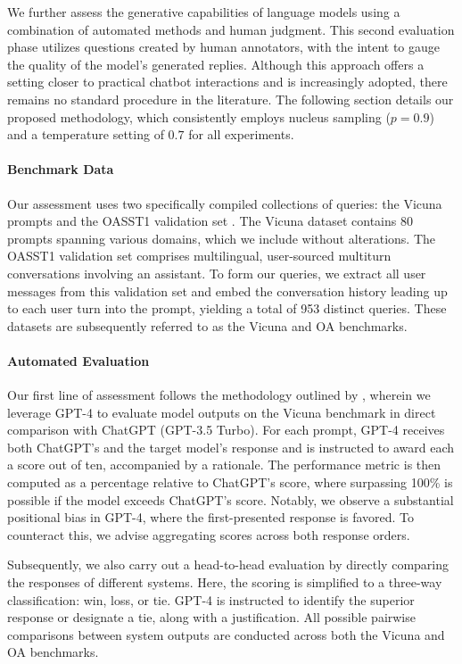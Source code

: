 We further assess the generative capabilities of language models using a combination of automated methods and human judgment. This second evaluation phase utilizes questions created by human annotators, with the intent to gauge the quality of the model's generated replies. Although this approach offers a setting closer to practical chatbot interactions and is increasingly adopted, there remains no standard procedure in the literature. The following section details our proposed methodology, which consistently employs nucleus sampling ($p=0.9$) and a temperature setting of $0.7$ for all experiments.

\paragraph{Benchmark Data} Our assessment uses two specifically compiled collections of queries: the Vicuna prompts \citep{vicuna2023} and the OASST1 validation set \citep{kopf2023openassistant}. The Vicuna dataset contains 80 prompts spanning various domains, which we include without alterations. The OASST1 validation set comprises multilingual, user-sourced multiturn conversations involving an assistant. To form our queries, we extract all user messages from this validation set and embed the conversation history leading up to each user turn into the prompt, yielding a total of 953 distinct queries. These datasets are subsequently referred to as the Vicuna and OA benchmarks.

\paragraph{Automated Evaluation} Our first line of assessment follows the methodology outlined by \citet{vicuna2023}, wherein we leverage GPT-4 to evaluate model outputs on the Vicuna benchmark in direct comparison with ChatGPT (GPT-3.5 Turbo). For each prompt, GPT-4 receives both ChatGPT’s and the target model’s response and is instructed to award each a score out of ten, accompanied by a rationale. The performance metric is then computed as a percentage relative to ChatGPT’s score, where surpassing 100\% is possible if the model exceeds ChatGPT’s score. Notably, we observe a substantial positional bias in GPT-4, where the first-presented response is favored. To counteract this, we advise aggregating scores across both response orders.

Subsequently, we also carry out a head-to-head evaluation by directly comparing the responses of different systems. Here, the scoring is simplified to a three-way classification: win, loss, or tie. GPT-4 is instructed to identify the superior response or designate a tie, along with a justification. All possible pairwise comparisons between system outputs are conducted across both the Vicuna and OA benchmarks.

